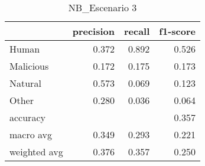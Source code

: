 \begin{table}
\centering
\caption{NB_Escenario 3}
\label{tab:Reporte de clasificación para el Escenario 3 utilizando Naïve Bayes}
\begin{tabular}{lrrr}
\toprule
{} &  precision &  recall &  f1-score \\
\midrule
Human        &      0.372 &   0.892 &     0.526 \\
Malicious    &      0.172 &   0.175 &     0.173 \\
Natural      &      0.573 &   0.069 &     0.123 \\
Other        &      0.280 &   0.036 &     0.064 \\
accuracy     &            &         &     0.357 \\
macro avg    &      0.349 &   0.293 &     0.221 \\
weighted avg &      0.376 &   0.357 &     0.250 \\
\bottomrule
\end{tabular}
\end{table}
